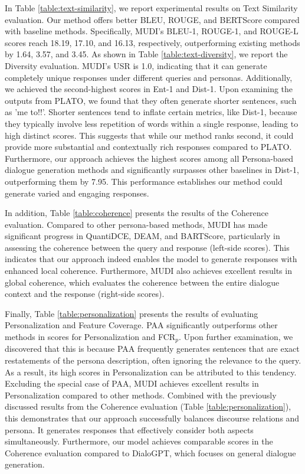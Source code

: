 \documentclass[letterpaper]{article} %
\begin{document}
In Table \ref{table:text-similarity}, we report experimental results on Text Similarity evaluation. Our method offers better BLEU, ROUGE, and BERTScore compared with baseline methods. Specifically, MUDI's BLEU-1, ROUGE-1, and ROUGE-L scores reach 18.19, 17.10, and 16.13, respectively, outperforming existing methods by 1.64, 3.57, and 3.45. As shown in Table \ref{table:text-diversity}, we report the Diversity evaluation. MUDI's USR is 1.0, indicating that it can generate completely unique responses under different queries and personas. Additionally, we achieved the second-highest scores in Ent-1 and Dist-1. Upon examining the outputs from PLATO, we found that they often generate shorter sentences, such as 'me to!!'. Shorter sentences tend to inflate certain metrics, like Dist-1, because they typically involve less repetition of words within a single response, leading to high distinct scores. This suggests that while our method ranks second, it could provide more substantial and contextually rich responses compared to PLATO. Furthermore, our approach achieves the highest scores among all Persona-based dialogue generation methods and significantly surpasses other baselines in Dist-1, outperforming them by 7.95. This performance establishes our method could generate varied and engaging responses.

In addition, Table \ref{table:coherence} presents the results of the Coherence evaluation. Compared to other persona-based methods, MUDI has made significant progress in QuantiDCE, DEAM, and BARTScore, particularly in assessing the coherence between the query and response (left-side scores). This indicates that our approach indeed enables the model to generate responses with enhanced local coherence. Furthermore, MUDI also achieves excellent results in global coherence, which evaluates the coherence between the entire dialogue context and the response (right-side scores).

Finally, Table \ref{table:personalization} presents the results of evaluating Personalization and Feature Coverage. PAA significantly outperforms other methods in scores for Personalization and FCR$_p$. Upon further examination, we discovered that this is because PAA frequently generates sentences that are exact restatements of the persona description, often ignoring the relevance to the query. As a result, its high scores in Personalization can be attributed to this tendency. Excluding the special case of PAA, MUDI achieves excellent results in Personalization compared to other methods. Combined with the previously discussed results from the Coherence evaluation (Table \ref{table:personalization}), this demonstrates that our approach successfully balances discourse relations and persona. It generates responses that effectively consider both aspects simultaneously. Furthermore, our model achieves comparable scores in the Coherence evaluation compared to DialoGPT, which focuses on general dialogue generation.
\end{document}
